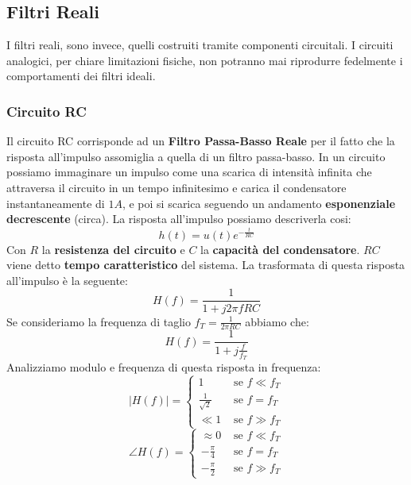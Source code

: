 \subsection{Filtri Reali}
I filtri reali, sono invece, quelli costruiti tramite componenti circuitali. I circuiti analogici, per chiare limitazioni fisiche,
non potranno mai riprodurre fedelmente i comportamenti dei filtri ideali.
\subsubsection{Circuito RC}
Il circuito RC corrisponde ad un \textbf{Filtro Passa-Basso Reale} per il fatto che la risposta all'impulso assomiglia
a quella di un filtro passa-basso. In un circuito possiamo immaginare un impulso come una scarica di intensità infinita
che attraversa il circuito in un tempo infinitesimo e carica il condensatore instantaneamente di $1A$, e poi si scarica seguendo
un andamento \textbf{esponenziale decrescente} (circa). La risposta all'impulso possiamo descriverla cosi:
\begin{equation}
    h(t) = u(t)e^{-\frac{t}{RC}}
\end{equation}
Con $R$ la \textbf{resistenza del circuito} e $C$ la \textbf{capacità del condensatore}. $RC$ viene detto \textbf{tempo caratteristico} del sistema.
La trasformata di questa risposta all'impulso è la seguente:
\begin{equation*}
    H(f) = \frac{1}{1 + j2\pi f RC}
\end{equation*}
Se consideriamo la frequenza di taglio $f_T = \frac{1}{2\pi RC}$ abbiamo che:
\begin{equation}
    H(f) = \frac{1}{1 + j\frac{f}{f_T}}
\end{equation} 
Analizziamo modulo e frequenza di questa risposta in frequenza:
\begin{equation}
    |H(f)| = 
    \begin{cases}
        1 &\text{ se } f \ll f_T\\
        \frac{1}{\sqrt{2}} &\text{ se } f = f_T \\
        \ll 1 &\text{ se } f \gg f_T   
    \end{cases}
\end{equation}
\begin{equation}
    \angle H(f)= 
    \begin{cases}
        \approx 0 &\text{ se } f \ll f_T\\
        -\frac{\pi}{4} &\text{ se } f = f_T \\
        -\frac{\pi}{2} &\text{ se } f \gg f_T   
    \end{cases}
\end{equation}
